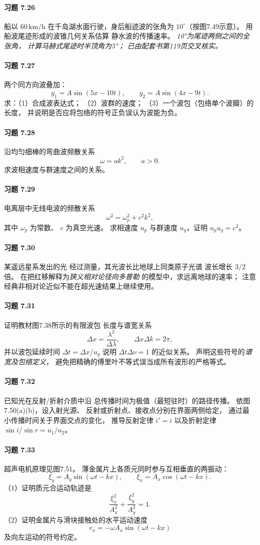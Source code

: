 \paragraph{习题 7.26}
船以
\(60\,\mathrm{km/h}\)
在千岛湖水面行驶，身后船迹波的张角为
\(10^\circ\)（按图7.49示意）。
用船波尾迹形成的波锥几何关系估算
静水波的传播速率。
\textit{10°为尾迹两侧之间的全张角，
计算马赫式尾迹时半顶角为5°；
已由配套书第119页交叉核实。}

\paragraph{习题 7.27}
两个同方向波叠加：
\[
 y_1=A\sin(5x-10t),\qquad
 y_2=A\sin(4x-9t).
\]
求：（1）合成波表达式；
（2）波群的速度；
（3）一个波包（包络单个波瓣）的长度，
并说明是否应将包络的符号正负误认为波能为负。

\paragraph{习题 7.28}
沿均匀细棒的弯曲波频散关系
\[
 \omega=ak^2,\qquad a>0.
\]
求波相速度与群速度之间的关系。

\paragraph{习题 7.29}
电离层中无线电波的频散关系
\[
 \omega^2=\omega_p^2+c^2k^2,
\]
其中 \(\omega_p\) 为常数、
\(c\) 为真空光速。
求相速度 \(u_p\) 与群速度
\(u_g\)，证明
\(u_pu_g=c^2\)。

\paragraph{习题 7.30}
某遥远星系发出的光
经过测量，其光波长比地球上同类原子光谱
波长增长 \(3/2\) 倍。
在把红移解释为\emph{狭义相对论径向多普勒}
的模型中，求远离地球的速率；
注意经典非相对论近似不能在超光速结果上继续使用。

\paragraph{习题 7.31}
证明教材图7.38所示的有限波包
长度与谱宽关系
\[
 \Delta x=\frac{\lambda^2}{\Delta\lambda},
 \qquad
 \Delta x\Delta k=2\pi,
\]
并以波包延续时间
\(\Delta t=\Delta x/u_g\) 说明
\(\Delta t\Delta\nu=1\) 的近似关系。
声明这些符号的\emph{谱宽及包络定义}，
避免把精确的傅里叶不等式误当成所有波形的严格等式。

\paragraph{习题 7.32}
已知光在反射/折射介质中沿
总传播时间为极值（最短驻时）的路径传播。
依图7.50(a)(b)，设入射光源、
反射或折射点、接收点分别在界面两侧给定，
通过最小传播时间关于界面交点的变化，
推导反射定律
\(i'=i\) 以及折射定律
\(\sin i/\sin r=u_1/u_2\)。

\paragraph{习题 7.33}
超声电机原理见图7.51。
薄金属片上各质元同时参与互相垂直的两振动：
\[
 \xi_y=A_y\sin(\omega t-kx),\qquad
 \xi_x=A_x\cos(\omega t-kx).
\]
（1）证明质元合运动轨迹是
\[
 \frac{\xi_x^2}{A_x^2}+
 \frac{\xi_y^2}{A_y^2}=1.
\]
（2）证明金属片与滑块接触处的水平运动速度
\[
 v_x=-\omega A_x\sin(\omega t-kx)
\]
及向左运动的符号约定。
